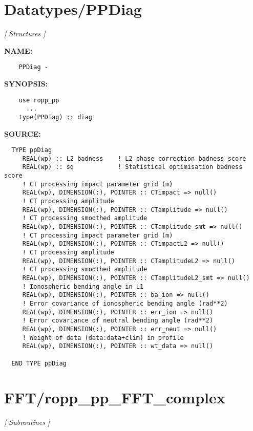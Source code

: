 \section{Datatypes/PPDiag}
\textsl{[ Structures ]}

\label{ch:robo11}
\label{ch:Datatypes_PPDiag}
\textbf{NAME:}\hspace{0.08in}\begin{Verbatim}
    PPDiag -
\end{Verbatim}
\textbf{SYNOPSIS:}\hspace{0.08in}\begin{Verbatim}
    use ropp_pp
      ...
    type(PPDiag) :: diag
\end{Verbatim}
\textbf{SOURCE:}\hspace{0.08in}\begin{Verbatim}
  TYPE ppDiag
     REAL(wp) :: L2_badness    ! L2 phase correction badness score
     REAL(wp) :: sq            ! Statistical optimisation badness score
     ! CT processing impact parameter grid (m)
     REAL(wp), DIMENSION(:), POINTER :: CTimpact => null()
     ! CT processing amplitude 
     REAL(wp), DIMENSION(:), POINTER :: CTamplitude => null()
     ! CT processing smoothed amplitude 
     REAL(wp), DIMENSION(:), POINTER :: CTamplitude_smt => null()
     ! CT processing impact parameter grid (m)
     REAL(wp), DIMENSION(:), POINTER :: CTimpactL2 => null()
     ! CT processing amplitude 
     REAL(wp), DIMENSION(:), POINTER :: CTamplitudeL2 => null()
     ! CT processing smoothed amplitude 
     REAL(wp), DIMENSION(:), POINTER :: CTamplitudeL2_smt => null()
     ! Ionospheric bending angle in L1
     REAL(wp), DIMENSION(:), POINTER :: ba_ion => null()    
     ! Error covariance of ionospheric bending angle (rad**2)
     REAL(wp), DIMENSION(:), POINTER :: err_ion => null()   
     ! Error covariance of neutral bending angle (rad**2)
     REAL(wp), DIMENSION(:), POINTER :: err_neut => null()
     ! Weight of data (data:data+clim) in profile
     REAL(wp), DIMENSION(:), POINTER :: wt_data => null()

  END TYPE ppDiag
\end{Verbatim}
\section{FFT/ropp\_pp\_FFT\_complex}
\textsl{[ Subroutines ]}

